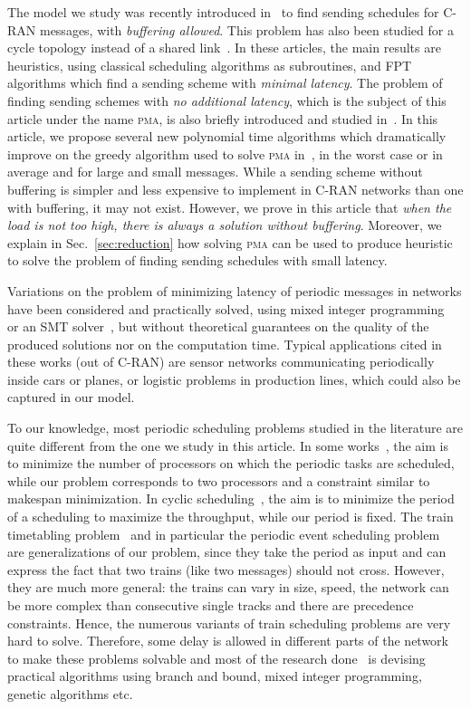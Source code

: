 \documentclass[a4paper,UKenglish,cleveref, autoref, thm-restate]{lipics-v2019}
\newcommand\pma{\textsc{pma}\xspace}
\begin{document}
The model we study was recently introduced in~\cite{dominique2018deterministic} to find sending schedules for C-RAN messages, with \emph{buffering allowed}. This problem has also been studied for a cycle topology instead of a shared link~\cite{Guir1905:Deterministic}. In these articles, the main results are heuristics, using classical scheduling algorithms as subroutines, and FPT algorithms which find a sending scheme with \emph{minimal latency}. The problem of finding sending schemes with \emph{no additional latency}, which is the subject of this article under the name \pma, is also briefly introduced and studied in~\cite{dominique2018deterministic}.
In this article, we propose several new polynomial time algorithms which dramatically improve on the greedy algorithm used to solve \pma in~\cite{dominique2018deterministic}, in the worst case or in average and for large and small messages. 
While a sending scheme without buffering is simpler and less expensive to implement in C-RAN networks than one with buffering, it may not exist. However, we prove in this article that \emph{when the load is not too high,
there is always a solution without buffering}. Moreover, we explain in Sec.~\ref{sec:reduction} how solving \pma can be used to produce heuristic to solve the problem of finding sending schedules with small latency.

 Variations on the problem of minimizing latency of periodic messages in networks have been considered and practically solved, using mixed integer programming~\cite{nayak2017incremental,steiner2018traffic} or an SMT solver~\cite{dos2019tsnsched}, but without theoretical guarantees on the quality of the produced solutions nor on the computation time. Typical applications cited in these works (out of C-RAN) are sensor networks communicating periodically inside cars or planes, or logistic problems in production lines, which could also be captured in our model.

 To our knowledge, most periodic scheduling problems studied in the literature are quite different from the one we study in this article. In some works~\cite{korst1991periodic,hanen1993cyclic}, the aim is to minimize the number of processors on which the periodic tasks are scheduled, while our problem corresponds to two processors and a constraint similar to makespan minimization. In cyclic scheduling~\cite{levner2010complexity}, the aim is to minimize the period of a scheduling to maximize the throughput, while our period is fixed. The train timetabling problem~\cite{lusby2011railway} and in particular the periodic event scheduling problem~\cite{serafini1989mathematical} are generalizations of our problem, since they take the period as input and can express the fact that two trains (like two messages) should not cross. However, they are much more general: the trains can vary in size, speed, the network can be more complex than consecutive single tracks and there are precedence constraints. Hence, the numerous variants of train scheduling problems are very hard to solve. Therefore, some delay is allowed in different parts of the network to make these problems solvable and most of the research done~\cite{lusby2011railway} is devising practical algorithms using branch and bound, mixed integer programming, genetic algorithms etc. 
 
\end{document}
